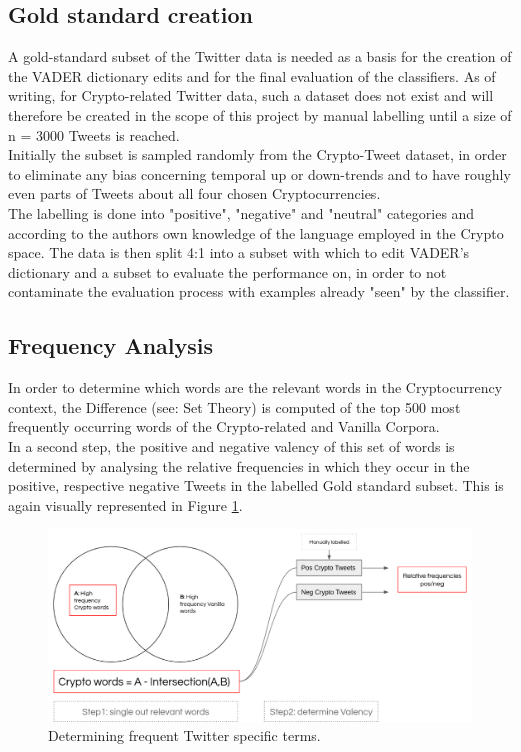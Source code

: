 \documentclass[11pt]{article}
\begin{document}
\subsection{Gold standard creation}
A gold-standard subset of the Twitter data is needed as a basis for the creation of the VADER dictionary edits and for the final evaluation of the classifiers. As of writing, for Crypto-related Twitter data, such a dataset does not exist and will therefore be created in the scope of this project by manual labelling until a size of n = 3000 Tweets is reached. \\
Initially the subset is sampled randomly from the Crypto-Tweet dataset, in order to eliminate any bias concerning temporal up or down-trends and to have roughly even parts of Tweets about all four chosen Cryptocurrencies. \\
The labelling is done into "positive", "negative" and "neutral" categories and according to the authors own knowledge of the language employed in the Crypto space. The data is then split 4:1 into a subset with which to edit VADER's dictionary and a subset to evaluate the performance on, in order to not contaminate the evaluation process with examples already "seen" by the classifier. \\

\subsection{Frequency Analysis}
In order to determine which words are the relevant words in the Cryptocurrency context, the Difference (see: Set Theory) is computed of the top 500 most frequently occurring words of the Crypto-related and Vanilla Corpora. \\
In a second step, the positive and negative valency of this set of words is determined by analysing the relative frequencies in which they occur in the positive, respective negative Tweets in the labelled Gold standard subset. This is again visually represented in Figure \ref{fig:frequent_terms}. \\

\begin{figure}
\centering
\includegraphics[scale=0.55]{figures/frequent_terms.png}
\caption {Determining frequent Twitter specific terms.}
\label{fig:frequent_terms}
\end{figure}
\end{document}
